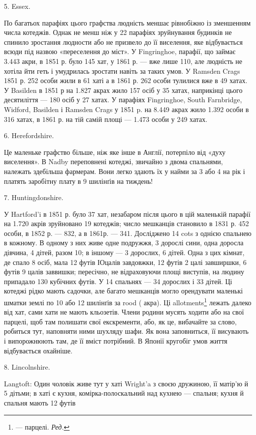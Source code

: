 \parcont{}  %
5. Essex.

По багатьох парафіях цього графства людність меншає рівнобіжно
із зменшенням числа котеджів. Однак не менш ніж у
22 парафіях зруйнування будинків не спинило зростання людности
або не призвело до її виселення, яке відбувається всюди під
назвою «переселення до міст». У Fingringhoe, парафії, що займає
\num{3.443} акри, в 1851 р. було 145 хат, у 1861 р. — вже лише 110, але
людність не хотіла йти геть і умудрилась зростати навіть за
таких умов. У Ramsden Crags 1851 р. 252 особи жили в 61 хаті
а в 1861 р. 262 особи тулилися вже в 49 хатах. У Basilden в 1851 р
на \num{1.827} акрах жило 157 осіб у 35 хатах, наприкінці цього десятиліття
— 180 осіб у 27 хатах. У парафіях Fingringhoe, South
Farnbridge, Widford, Basilden і Ramsden Crags у 1851 p. на
\num{8.449} акрах жило \num{1.392} особи в 316 хатах, в 1861 р. на тій самій
площі — \num{1.473} особи у 249 хатах.

6. Herefordshire.

Це маленьке графство більше, ніж яке інше в Англії, потерпіло
від «духу виселення». В Nadby переповнені котеджі,
звичайно з двома спальнями, належать здебільша фармерам.
Вони легко здають їх у найми за 3 або 4 на рік
і платять заробітну плату в 9 шилінґів на тиждень!

7. Huntingdonshire.

У Hartford’i в 1851 р. було 37 хат, незабаром після цього
в цій маленькій парафії на \num{1.720} акрів зруйновано 19 котеджів;
число мешканців становило в 1831 р. 452 особи, в 1852 р. — 832,
а в 1861р. — 341. Досліджено 14 cots з однією спальнею в кожному.
В одному з них живе одне подружжя, 3 дорослі сини, одна
доросла дівчина, 4 дітей, разом 10; в іншому — 3 дорослих,
6 дітей. Одна з цих кімнат, де спало 8 осіб, мала 12 футів ІОцалів
завдовжки, 12 футів 2 цалі завширшки, 6 футів 9 цалів заввишки;
пересічно, не відраховуючи площі виступів, на людину припадало
130 кубічних футів. У 14 спальнях — 34 дорослих і 33 дітей. Ці
котеджі рідко мають садочки, але багато мешканців могло орендувати
маленькі шматки землі по 10 або 12 шилінґів за rood ( акра).
Ці allotments\footnote*{
— парцелі. \emph{Ред.}
} лежать далеко від хат, сами хати не мають кльозетів.
Члени родини мусять ходити або на свої парцелі, щоб там
полишати свої екскременти, або, як це, вибачайте за слово, робиться
тут, наповняти ними шухляду шафи. Як вона заповниться,
її висувають і випорожнюють там, де її вміст потрібний. В Японії
кругобіг умов життя відбувається охайніше.

8. Lincolnshire.

Langtoft: Один чоловік живе тут у хаті Wright’a з своєю дружиною,
її матір’ю й 5 дітьми; в хаті є кухня, комірка-полоскальний
над кухнею — спальня; кухня й спальня мають 12 футів

\parbreak{}  %
